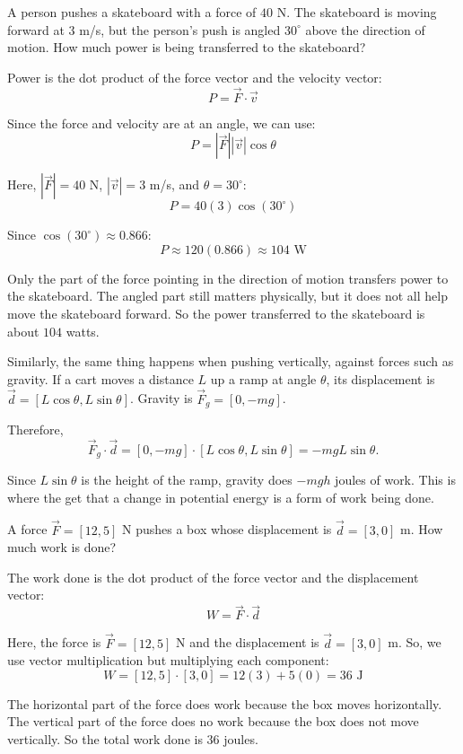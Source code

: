 \begin{Exercise}[title={Power at an angle}, label=power_angle]
A person pushes a skateboard with a force of $40$ N. The skateboard is moving forward at
$3$ m/s, but the person's push is angled $30^\circ$ above the direction of motion.
How much power is being transferred to the skateboard?
\end{Exercise}

\begin{Answer}[ref=power_angle]
Power is the dot product of the force vector and the velocity vector:
\[
P = \vec{F} \cdot \vec{v}
\]

Since the force and velocity are at an angle, we can use:
\[
P = |\vec{F}| |\vec{v}| \cos\theta
\]

Here, $|\vec{F}| = 40$ N, $|\vec{v}| = 3$ m/s, and $\theta = 30^\circ$:
\[
P = 40(3)\cos(30^\circ)
\]

Since $\cos(30^\circ) \approx 0.866$:
\[
P \approx 120(0.866) \approx 104 \text{ W}
\]

Only the part of the force pointing in the direction of motion transfers power
to the skateboard. The angled part still matters physically, but it does not all help
move the skateboard forward. So the power transferred to the skateboard is about $104$ watts.
\end{Answer}

Similarly, the same thing happens when pushing vertically, against forces such as gravity.
If a cart moves a distance $L$ up a ramp at angle $\theta$, its displacement is
$\vec{d} = [L\cos\theta, L\sin\theta]$. Gravity is $\vec{F}_g = [0, -mg]$.

Therefore,
$$\vec{F}_g \cdot \vec{d} = [0, -mg] \cdot [L\cos\theta, L\sin\theta]
= -mgL\sin\theta.$$

Since $L\sin\theta$ is the height of the ramp, gravity does $-mgh$ joules of work. This is where the get that a change in potential energy is a form of work being done.

\begin{Exercise}[title={Work done on a Box}, label={ex:work_pll}]
A force $\vec{F} = [12, 5]$ N pushes a box whose displacement is
$\vec{d} = [3, 0]$ m. How much work is done?
\end{Exercise}

\begin{Answer}[ref=work_pll]
The work done is the dot product of the force vector and the displacement vector:
\[
W = \vec{F} \cdot \vec{d}
\]

Here, the force is $\vec{F} = [12, 5]$ N and the displacement is
$\vec{d} = [3, 0]$ m. So, we use vector multiplication but multiplying each component:
\[
W = [12, 5] \cdot [3, 0] = 12(3) + 5(0) = 36 \text{ J}
\]

The horizontal part of the force does work because the box moves horizontally.
The vertical part of the force does no work because the box does not move
vertically. So the total work done is $36$ joules.
\end{Answer}